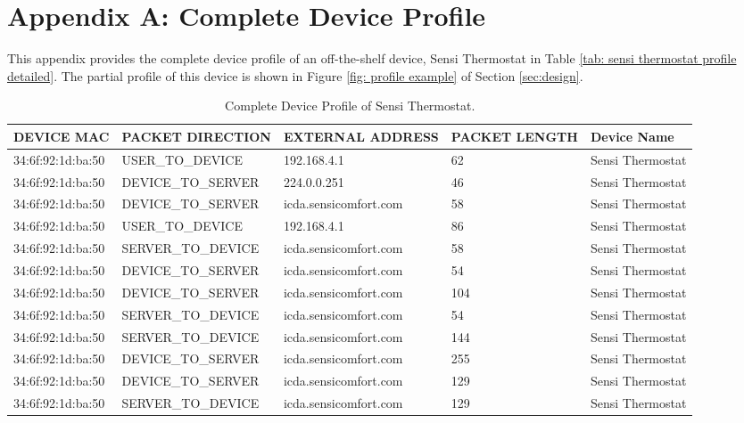 \renewcommand{\thetable}{A\arabic{table}}
\setcounter{table}{0}

\section*{Appendix A: Complete Device Profile}
\label{appendix: profile}
This appendix provides the complete device profile of an off-the-shelf device, Sensi Thermostat in Table \ref{tab: sensi thermostat profile detailed}. The partial profile of this device is shown in Figure \ref{fig: profile example} of Section \ref{sec:design}.
    \begin{table*}[t!]
	\centering
        \caption{Complete Device Profile of Sensi Thermostat.}
        \footnotesize
\begin{tabularx}{\textwidth}{p{3cm} p{4cm} p{4cm} p{2cm} p{2cm}} 
  \toprule
    \textbf{DEVICE MAC} & \textbf{PACKET DIRECTION} & \textbf{EXTERNAL ADDRESS} &  \textbf{PACKET LENGTH} & \textbf{Device Name}\\ \hline
34:6f:92:1d:ba:50 &	USER\_TO\_DEVICE   &   	192.168.4.1	&			62 &	Sensi Thermostat \\ \hline
34:6f:92:1d:ba:50 &	DEVICE\_TO\_SERVER &   	224.0.0.251	&			46 &	Sensi Thermostat \\ \hline
34:6f:92:1d:ba:50 &	DEVICE\_TO\_SERVER &   	icda.sensicomfort.com &	58 &	Sensi Thermostat \\ \hline
34:6f:92:1d:ba:50 &	USER\_TO\_DEVICE   &   	192.168.4.1			  &	86 &	Sensi Thermostat \\ \hline
34:6f:92:1d:ba:50 &	SERVER\_TO\_DEVICE &   	icda.sensicomfort.com &	58 &	Sensi Thermostat \\ \hline
34:6f:92:1d:ba:50 &	DEVICE\_TO\_SERVER &   	icda.sensicomfort.com &	54 &	Sensi Thermostat \\ \hline
34:6f:92:1d:ba:50 &	DEVICE\_TO\_SERVER &   	icda.sensicomfort.com &	104 &	Sensi Thermostat \\ \hline
34:6f:92:1d:ba:50 &	SERVER\_TO\_DEVICE &   	icda.sensicomfort.com &	54 &   	Sensi Thermostat \\ \hline
34:6f:92:1d:ba:50 &	SERVER\_TO\_DEVICE &   	icda.sensicomfort.com &	144 &   Sensi Thermostat \\ \hline
34:6f:92:1d:ba:50 &	DEVICE\_TO\_SERVER &   	icda.sensicomfort.com &	255 &   Sensi Thermostat \\ \hline
34:6f:92:1d:ba:50 &	DEVICE\_TO\_SERVER &	icda.sensicomfort.com &	129	 & Sensi Thermostat \\ \hline
34:6f:92:1d:ba:50 &	SERVER\_TO\_DEVICE &	icda.sensicomfort.com &	129	 & Sensi Thermostat \\ \hline

\end{tabularx}
\end{table*}
